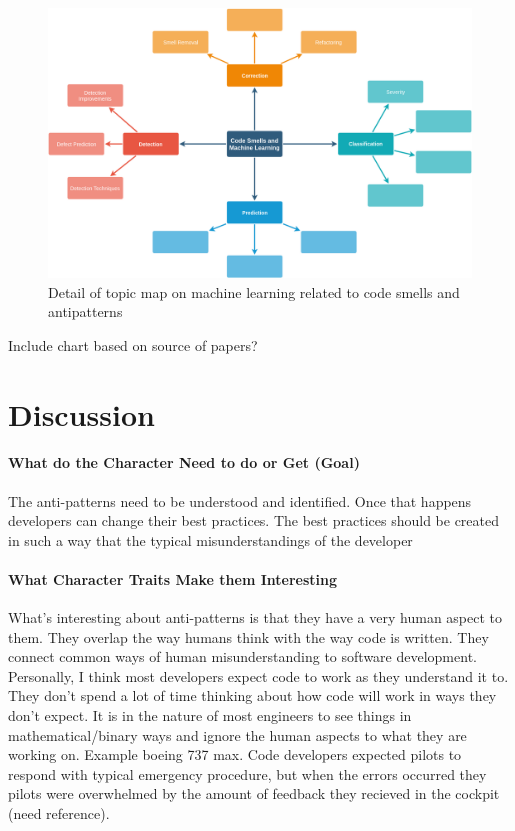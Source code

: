\documentclass[conference]{IEEEtran}
\begin{document}
\begin{figure}[!ht]
  \centerline{\includegraphics[width=\textwidth]{ML-codesmells.png}}
  \caption{Detail of topic map on machine learning related to code smells and antipatterns}
  \label{fig:ML}
\end{figure} 

Include chart based on source of papers?

\section{Discussion}

\paragraph{What do the Character Need to do or Get (Goal)}
The anti-patterns need to be understood and identified.
Once that happens developers can change their best practices.
The best practices should be created in such a way that the typical misunderstandings of the developer


\paragraph{What Character Traits Make them Interesting}
What's interesting about anti-patterns is that they have a very human aspect to them. 
They overlap the way humans think with the way code is written. 
They connect common ways of human misunderstanding to software development. 
Personally, I think most developers expect code to work as they understand it to. 
They don't spend a lot of time thinking about how code will work in ways they don't expect.
It is in the nature of most engineers to see things in mathematical/binary ways and ignore the human aspects to what they are working on.
Example boeing 737 max.
Code developers expected pilots to respond with typical emergency procedure, but when the errors occurred they pilots were overwhelmed by the amount of feedback they recieved in the cockpit (need reference).
\end{document}
